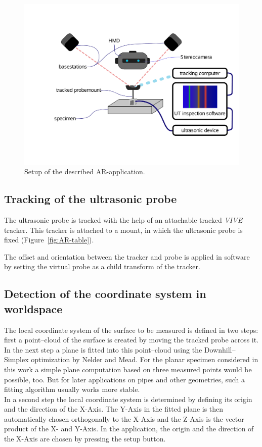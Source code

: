 \documentclass{VRARWorkshop}
\begin{document}
\begin{figure}[h!]
    \begin{center}
        \includegraphics[width=158mm]{images/Setup-ARUS}
        \caption{\label{fig:Setup} Setup of the described AR-application.}
    \end{center}
\end{figure}

\subsection{Tracking of the ultrasonic probe}
The ultrasonic probe is tracked with the help of an attachable tracked \textit{VIVE} tracker.
This tracker is attached to a mount, in which the ultrasonic probe is fixed (Figure~\ref{fig:AR-table}).

The offset and orientation between the tracker and probe is applied in software by setting the virtual probe as a child transform of the tracker.

\subsection{Detection of the coordinate system in worldspace}
The local coordinate system of the surface to be measured is defined in two steps:
first a point--cloud of the surface is created by moving the tracked probe across it.
In the next step a plane is fitted into this point--cloud using the Downhill--Simplex optimization by Nelder and Mead. For the planar specimen considered in this work a simple plane computation based on three measured points
would be possible, too. But for later applications on pipes and other geometries, such a fitting algorithm usually works more stable. \\
In a second step the local coordinate system is determined by defining its origin and the direction of the X-Axis.
The Y-Axis in the fitted plane is then automatically chosen orthogonally to the X-Axis and the Z-Axis is the vector product of the X- and Y-Axis.
In the application, the origin and the direction of the X-Axis are chosen by pressing the setup button.
\end{document}
